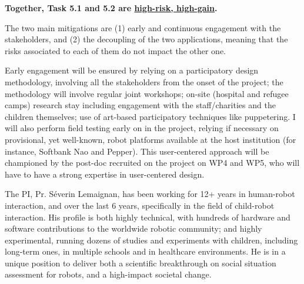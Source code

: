 \documentclass[11pt,a4paper]{report}
\begin{document}
\textbf{Together, Task 5.1 and 5.2 are \ul{high-risk, high-gain}.}

The two main mitigations are (1) early and continuous engagement with the
stakeholders, and (2) the decoupling of the two applications, meaning that the
risks associated to each of them do not impact the other one.

Early engagement will be ensured by relying on a participatory design
methodology, involving all the stakeholders from the onset of the project; the
methodology will involve regular joint workshops; on-site (hospital and refugee
camps) research stay including engagement with the staff/charities and the
children themselves; use of art-based participatory techniques like puppetering.
I will also perform field testing early on in the project, relying if necessary
on provisional, yet well-known, robot platforms available at the host
institution (for instance, Softbank Nao and Pepper). This user-centered approach
will be championed by the post-doc recruited on the project on WP4 and WP5, who will
have to have a strong expertise in user-centered design.

The PI, Pr. Séverin Lemaignan, has been working for 12+
years in human-robot interaction, and over the last 6 years, specifically in the
field of child-robot interaction.  His profile is both highly technical, with
hundreds of hardware and software contributions to the worldwide robotic
community; and highly experimental, running dozens of studies and experiments
with children, including long-term ones, in multiple schools and in healthcare
environments. He is in a unique position to deliver both a scientific
breakthrough on social situation assessment for robots, and a high-impact
societal change.

\end{document}
